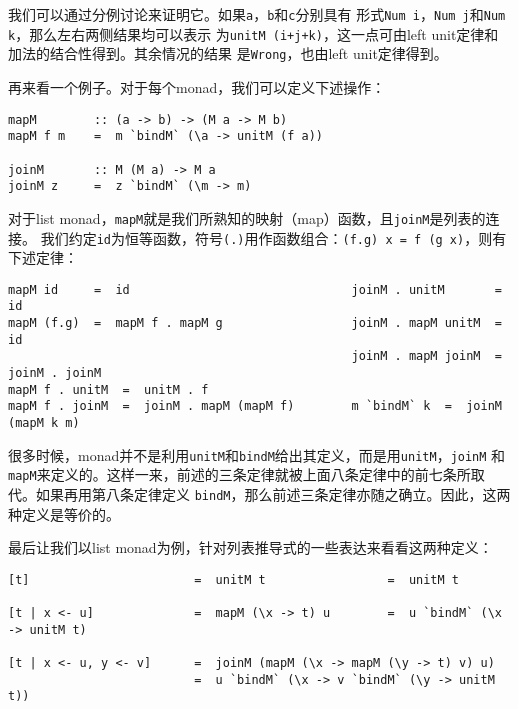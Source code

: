 \documentclass[12pt]{article}
\begin{document}
\indent{}我们可以通过分例讨论来证明它。如果\texttt{a}，\texttt{b}和\texttt{c}分别具有
形式\texttt{Num i}，\texttt{Num j}和\texttt{Num k}，那么左右两侧结果均可以表示
为\texttt{unitM (i+j+k)}，这一点可由left unit定律和加法的结合性得到。其余情况的结果
是\texttt{Wrong}，也由left unit定律得到。

\indent{}再来看一个例子。对于每个monad，我们可以定义下述操作：
\begin{verbatim}
mapM        :: (a -> b) -> (M a -> M b)
mapM f m    =  m `bindM` (\a -> unitM (f a))

joinM       :: M (M a) -> M a
joinM z     =  z `bindM` (\m -> m)
\end{verbatim}
\noindent{}对于list monad，\texttt{mapM}就是我们所熟知的映射（map）函数，且\texttt{joinM}是列表的连接。
我们约定\texttt{id}为恒等函数，符号\texttt{(.)}用作函数组合：\texttt{(f.g) x = f (g x)}，则有下述定律：
\begin{verbatim}
mapM id     =  id                               joinM . unitM       =  id
mapM (f.g)  =  mapM f . mapM g                  joinM . mapM unitM  =  id
                                                joinM . mapM joinM  =  joinM . joinM
mapM f . unitM  =  unitM . f
mapM f . joinM  =  joinM . mapM (mapM f)        m `bindM` k  =  joinM (mapM k m)
\end{verbatim}

\indent{}很多时候，monad并不是利用\texttt{unitM}和\texttt{bindM}给出其定义，而是用\texttt{unitM}，\texttt{joinM}
和\texttt{mapM}来定义的。这样一来，前述的三条定律就被上面八条定律中的前七条所取代。如果再用第八条定律定义
\texttt{bindM}，那么前述三条定律亦随之确立。因此，这两种定义是等价的。

\indent{}最后让我们以list monad为例，针对列表推导式的一些表达来看看这两种定义：
\begin{verbatim}
[t]                       =  unitM t                 =  unitM t

[t | x <- u]              =  mapM (\x -> t) u        =  u `bindM` (\x -> unitM t)

[t | x <- u, y <- v]      =  joinM (mapM (\x -> mapM (\y -> t) v) u)
                          =  u `bindM` (\x -> v `bindM` (\y -> unitM t))
\end{verbatim}
\end{document}
